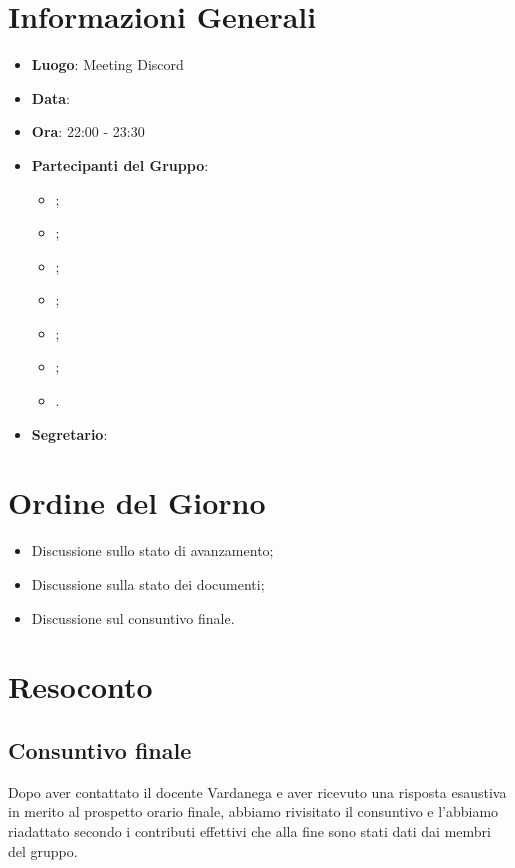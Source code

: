 \section{Informazioni Generali}

\begin{itemize}
	\item{\textbf{Luogo}}: Meeting Discord
	\item{\textbf{Data}}: \D
	\item{\textbf{Ora}}: 22:00 - 23:30
	\item{\textbf{Partecipanti del Gruppo}}:
	\begin{itemize}
		\item{\EP{};}
		\item{\FP{};}
		\item{\GC{};}
		\item{\LW{};}
  		\item {\MB{};}
		\item{\MG{};}
		\item{\PV{}.}
	\end{itemize}
	\item{\textbf{Segretario}}: \PV{}
\end{itemize}

\section{Ordine del Giorno}
\begin{itemize}
	\item{Discussione sullo stato di avanzamento;}
	\item{Discussione sulla stato dei documenti;}
 	\item{Discussione sul consuntivo finale.}
\end{itemize}

\section{Resoconto}
 
\subsection{Consuntivo finale}
Dopo aver contattato il docente Vardanega e aver ricevuto una risposta esaustiva in merito al prospetto orario finale, abbiamo rivisitato il consuntivo e l'abbiamo riadattato secondo i contributi effettivi che alla fine sono stati dati dai membri del gruppo.


